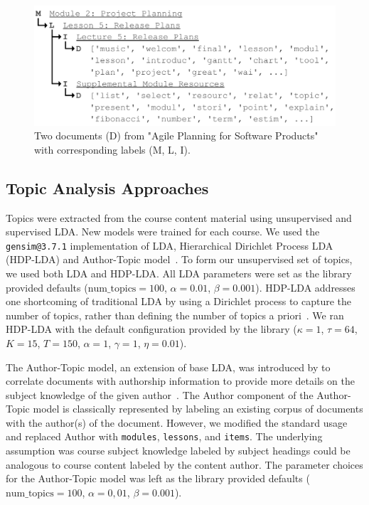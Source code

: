 \documentclass[sigconf, nonacm=true]{acmart}
\begin{document}
\begin{figure}
    \centering
    \includegraphics[width=\columnwidth]{figures/sample_doc}
    \caption{Two documents (D) from "Agile Planning for Software Products" with corresponding labels (M, L, I).}
    \label{fig:sample_doc}
\end{figure}

\subsection{Topic Analysis Approaches}
Topics were extracted from the course content material using unsupervised and supervised LDA.
New models were trained for each course.
We used the \texttt{gensim@3.7.1} implementation of LDA, Hierarchical Dirichlet Process LDA (HDP-LDA) and Author-Topic model~\cite{rehurek_lrec}.
To form our unsupervised set of topics, we used both LDA and HDP-LDA.
All LDA parameters were set as the library provided defaults ($\text{num\_topics}=100$, $\alpha=0.01$, $\beta=0.001$).
HDP-LDA addresses one shortcoming of traditional LDA by using a Dirichlet process to capture the number of topics, rather than defining the number of topics a priori~\cite{wang2011online}.
We ran HDP-LDA with the default configuration provided by the library ($\kappa=1$, $\tau=64$, $K=15$, $T=150$, $\alpha=1$, $\gamma=1$, $\eta=0.01$).

The Author-Topic model, an extension of base LDA, was introduced by \citeauthor{rosen2004author} to correlate documents with authorship information to provide more details on the subject knowledge of the given author~\cite{rosen2004author}.
The Author component of the Author-Topic model is classically represented by labeling an existing corpus of documents with the author(s) of the document.
However, we modified the standard usage and replaced Author with \texttt{modules}, \texttt{lessons}, and \texttt{items}.
The underlying assumption was course subject knowledge labeled by subject headings could be analogous to course content labeled by the content author.
The parameter choices for the Author-Topic model was left as the library provided defaults ($\text{num\_topics}=100$, $\alpha=0,01$, $\beta=0.001$).
\end{document}
